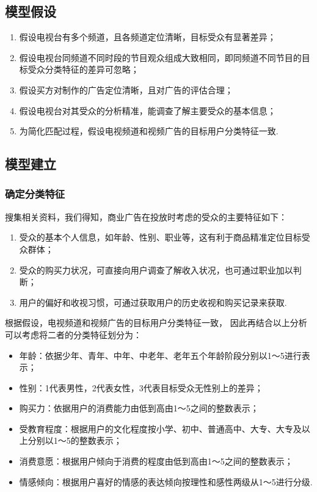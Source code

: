 \subsection{模型假设}

\begin{enumerate}[(1)]
    \item 假设电视台有多个频道，且各频道定位清晰，目标受众有显著差异；
    \item 假设电视台同频道不同时段的节目观众组成大致相同，即同频道不同节目的目标受众分类特征的差异可忽略；
    \item 假设买方对制作的广告定位清晰，且对广告的评估合理；
    \item 假设电视台对其受众的分析精准，能调查了解主要受众的基本信息；
    \item 为简化匹配过程，假设电视频道和视频广告的目标用户分类特征一致.
\end{enumerate}

\subsection{模型建立}

\subsubsection{确定分类特征}

搜集相关资料，我们得知，商业广告在投放时考虑的受众的主要特征如下：

\begin{enumerate}[(1)]
    \item 受众的基本个人信息，如年龄、性别、职业等，这有利于商品精准定位目标受众群体；
    \item 受众的购买力状况，可直接向用户调查了解收入状况，也可通过职业加以判断；
    \item 用户的偏好和收视习惯，可通过获取用户的历史收视和购买记录来获取.
\end{enumerate}

根据假设，电视频道和视频广告的目标用户分类特征一致，
因此再结合以上分析可以考虑将二者的分类特征划分为：

\begin{itemize}
    \item 年龄：依据少年、青年、中年、中老年、老年五个年龄阶段分别以1～5进行表示；
    \item 性别：1代表男性，2代表女性，3代表目标受众无性别上的差异；
    \item 购买力：依据用户的消费能力由低到高由1～5之间的整数表示；
    \item 受教育程度：根据用户的文化程度按小学、初中、普通高中、大专、大专及以上分别以1～5的整数表示；
    \item 消费意愿：根据用户倾向于消费的程度由低到高由1～5之间的整数表示；
    \item 情感倾向：根据用户喜好的情感的表达倾向按理性和感性两级从1～5进行分级.
\end{itemize}

